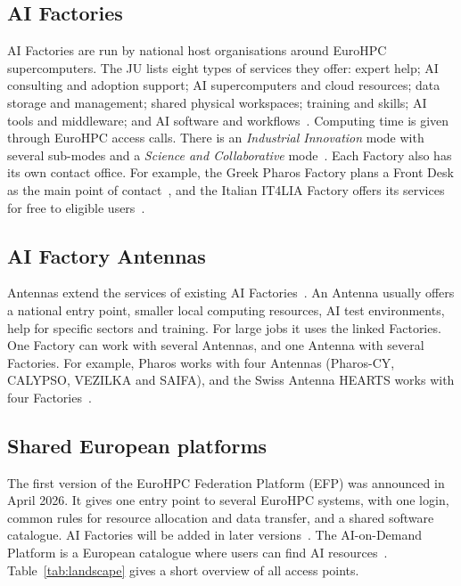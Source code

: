 \documentclass[conference,a4paper]{IEEEtran}
\begin{document}
\subsection{AI Factories}
AI Factories are run by national host organisations around EuroHPC supercomputers. The JU lists eight types of services they offer: expert help; AI consulting and adoption support; AI supercomputers and cloud resources; data storage and management; shared physical workspaces; training and skills; AI tools and middleware; and AI software and workflows~\cite{eurohpc_aif_services}. Computing time is given through EuroHPC access calls. There is an \emph{Industrial Innovation} mode with several sub-modes and a \emph{Science and Collaborative} mode~\cite{eurohpc_aif_access}. Each Factory also has its own contact office. For example, the Greek Pharos Factory plans a Front Desk as the main point of contact~\cite{eurohpc_pharos}, and the Italian IT4LIA Factory offers its services for free to eligible users~\cite{eurohpc_it4lia}.

\subsection{AI Factory Antennas}
Antennas extend the services of existing AI Factories~\cite{eurohpc_antennas_page}. An Antenna usually offers a national entry point, smaller local computing resources, AI test environments, help for specific sectors and training. For large jobs it uses the linked Factories. One Factory can work with several Antennas, and one Antenna with several Factories. For example, Pharos works with four Antennas (Pharos-CY, CALYPSO, VEZILKA and SAIFA), and the Swiss Antenna HEARTS works with four Factories~\cite{eurohpc_antennas}.

\subsection{Shared European platforms}
The first version of the EuroHPC Federation Platform (EFP) was announced in April 2026. It gives one entry point to several EuroHPC systems, with one login, common rules for resource allocation and data transfer, and a shared software catalogue. AI Factories will be added in later versions~\cite{eurohpc_efp}. The AI-on-Demand Platform is a European catalogue where users can find AI resources~\cite{aiod}. Table~\ref{tab:landscape} gives a short overview of all access points.
\end{document}
